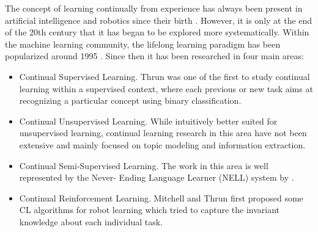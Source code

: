 \documentclass[english, LaM, oneside]{sapthesis}%
\begin{document}
The concept of learning continually from experience has always been present in artificial intelligence and robotics since their birth \cite{turing,weng}. However, it is only at the end of the 20th century that it has began to be explored more systematically. Within the machine learning community, the lifelong learning paradigm has been popularized around 1995 \cite{ring,thrun-mitchell,thrun}. Since then it has been researched in four main areas: 
\begin{itemize}
    \item Continual Supervised Learning. Thrun \cite{thrun} was one of the first to study continual learning within a supervised context, where each previous or new task aims at recognizing a particular concept using binary classification.
    \item Continual Unsupervised Learning. While intuitively better suited for unsupervised learning, continual learning research in this area have not been extensive and mainly focused on topic modeling and information extraction.
    \item Continual Semi-Supervised Learning. The work in this area is well represented by the Never- Ending Language Learner (NELL) system by \cite{carloson}.
    \item Continual Reinforcement Learning. Mitchell and Thrun \cite{mithcell-thrun} first proposed some CL algorithms for robot learning which tried to capture the invariant knowledge about each individual task.
\end{itemize}
\end{document}
